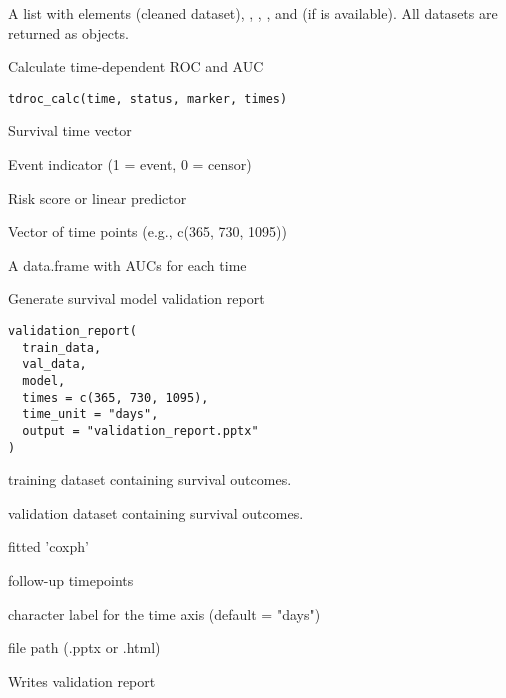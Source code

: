 \documentclass[letterpaper]{book}
\begin{document}
%
\begin{Value}
A list with elements  (cleaned dataset), , ,
, and  (if  is available). All datasets are
returned as  objects.
\end{Value}
%
\begin{Description}
Calculate time-dependent ROC and AUC
\end{Description}
%
\begin{Usage}
\begin{verbatim}
tdroc_calc(time, status, marker, times)
\end{verbatim}
\end{Usage}
%
\begin{Arguments}
\begin{ldescription}
\item[\code{time}] Survival time vector

\item[\code{status}] Event indicator (1 = event, 0 = censor)

\item[\code{marker}] Risk score or linear predictor

\item[\code{times}] Vector of time points (e.g., c(365, 730, 1095))
\end{ldescription}
\end{Arguments}
%
\begin{Value}
A data.frame with AUCs for each time
\end{Value}
%
\begin{Description}
Generate survival model validation report
\end{Description}
%
\begin{Usage}
\begin{verbatim}
validation_report(
  train_data,
  val_data,
  model,
  times = c(365, 730, 1095),
  time_unit = "days",
  output = "validation_report.pptx"
)
\end{verbatim}
\end{Usage}
%
\begin{Arguments}
\begin{ldescription}
\item[\code{train\_data}] training dataset containing survival outcomes.

\item[\code{val\_data}] validation dataset containing survival outcomes.

\item[\code{model}] fitted 'coxph'

\item[\code{times}] follow-up timepoints

\item[\code{time\_unit}] character label for the time axis (default = "days")

\item[\code{output}] file path (.pptx or .html)
\end{ldescription}
\end{Arguments}
%
\begin{Value}
Writes validation report
\end{Value}
\printindex{}
\end{document}
